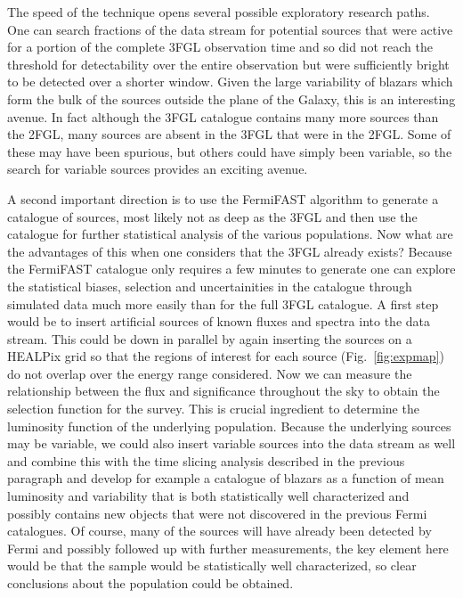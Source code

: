 \documentclass[useAMS,usenatbib]{mn2e}
\begin{document}
The speed of the technique opens several possible exploratory research
paths.  One can search fractions of the data stream for potential
sources that were active for a portion of the complete 3FGL observation
time and so did not reach the threshold for detectability over the
entire observation but were sufficiently bright to be detected over a
shorter window.  Given the large variability of blazars which form the
bulk of the sources outside the plane of the Galaxy, this is an
interesting avenue.  In fact although the 3FGL catalogue contains many
more sources than the 2FGL, many sources are absent in the 3FGL that
were in the 2FGL.  Some of these may have been spurious, but others
could have simply been variable, so the search for variable sources
provides an exciting avenue.

A second important direction is to use the FermiFAST algorithm to
generate a catalogue of sources, most likely not as deep as the 3FGL
and then use the catalogue for further statistical analysis of the
various populations.  Now what are the advantages of this when one
considers that the 3FGL already exists?  Because the FermiFAST
catalogue only requires a few minutes to generate one can explore the
statistical biases, selection and uncertainities in the catalogue
through simulated data much more easily than for the full 3FGL
catalogue.  A first step would be to insert artificial sources of
known fluxes and spectra into the data stream.  This could be down in
parallel by again inserting the sources on a HEALPix grid so that the
regions of interest for each source (Fig.~\ref{fig:expmap}) do not
overlap over the energy range considered.  Now we can measure the
relationship between the flux and significance throughout the sky to
obtain the selection function for the survey.  This is crucial
ingredient to determine the luminosity function of the underlying
population.  Because the underlying sources may be variable, we could
also insert variable sources into the data stream as well and combine
this with the time slicing analysis described in the previous
paragraph and develop for example a catalogue of blazars as a function
of mean luminosity and variability that is both statistically well
characterized and possibly contains new objects that were not
discovered in the previous Fermi catalogues.  Of course, many of the sources
will have already been detected by Fermi and possibly followed up
with further measurements, the key element here would be that the sample
would be statistically well characterized, so clear conclusions about the
population could be obtained.
\end{document}
